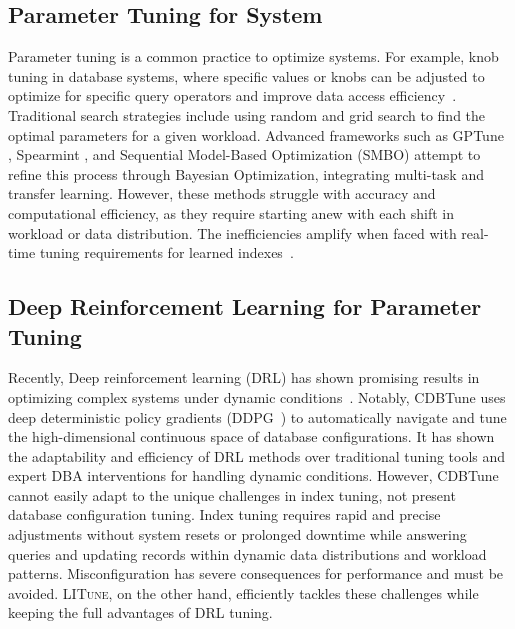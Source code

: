 \subsection{Parameter Tuning for System}
\label{sec:PT}
Parameter tuning is a common practice to optimize systems. For example, knob tuning in database systems, where specific values or knobs can be adjusted to optimize for specific query operators and improve data access efficiency~\cite{zhao2023automatic}. Traditional search strategies include using random and grid search to find the optimal parameters for a given workload. Advanced frameworks such as GPTune \cite{liu2021gptune}, Spearmint \cite{snoek2012practical}, and Sequential Model-Based Optimization (SMBO) \cite{ozaki2020multiobjective} attempt to refine this process through Bayesian Optimization, integrating multi-task and transfer learning. However, these methods struggle with accuracy and computational efficiency, as they require starting anew with each shift in workload or data distribution. The inefficiencies amplify when faced with real-time tuning requirements for learned indexes~\cite{feurer2015initializing}.

\subsection{Deep Reinforcement Learning for Parameter Tuning}
\label{sec:TD}
Recently, Deep reinforcement learning (DRL) has shown promising results in optimizing complex systems under dynamic conditions~\cite{kamthe2018data,chua2018deep}. Notably, CDBTune \cite{zhang2019end} uses deep deterministic policy gradients (DDPG~\cite{lillicrap2015continuous}) to automatically navigate and tune the high-dimensional continuous space of database configurations. It has shown the adaptability and efficiency of DRL methods over traditional tuning tools and expert DBA interventions for handling dynamic conditions. However, CDBTune cannot easily adapt to the unique challenges in index tuning, not present database configuration tuning. Index tuning requires rapid and precise adjustments without system resets or prolonged downtime while answering queries and updating records within dynamic data distributions and workload patterns. Misconfiguration has severe consequences for performance and must be avoided. \textsc{LITune}, on the other hand, efficiently tackles these challenges while keeping the full advantages of DRL tuning.


